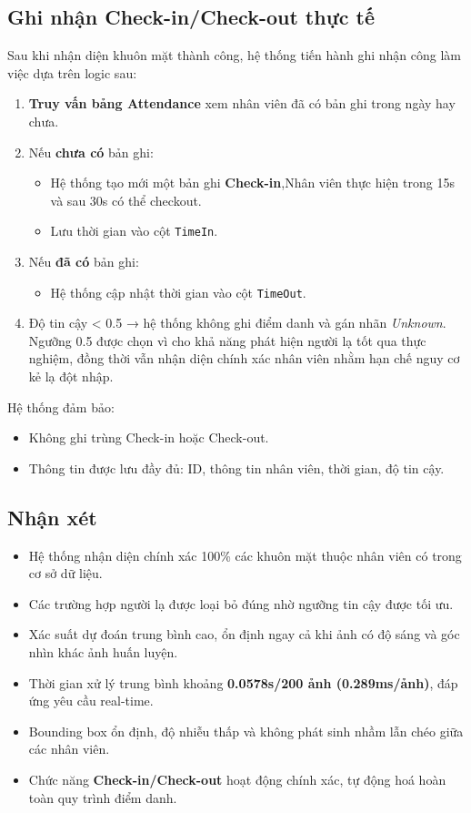 \documentclass[a4paper]{book}
\begin{document}
\subsection*{Ghi nhận Check-in/Check-out thực tế}

Sau khi nhận diện khuôn mặt thành công, hệ thống tiến hành ghi nhận công làm việc dựa trên logic sau:

\begin{enumerate}
    \item \textbf{Truy vấn bảng Attendance} xem nhân viên đã có bản ghi trong ngày hay chưa.
    \item Nếu \textbf{chưa có} bản ghi:
    \begin{itemize}
        \item Hệ thống tạo mới một bản ghi \textbf{Check-in},Nhân viên thực hiện trong 15s và sau 30s có thể checkout.
        \item Lưu thời gian vào cột \texttt{TimeIn}.
    \end{itemize}
    \item Nếu \textbf{đã có} bản ghi:
    \begin{itemize}
        \item Hệ thống cập nhật thời gian vào cột \texttt{TimeOut}.
    \end{itemize}
    \item Độ tin cậy < 0.5 → hệ thống không ghi điểm danh và gán nhãn \textit{Unknown}. Ngưỡng 0.5 được chọn vì cho khả năng phát hiện người lạ tốt qua thực nghiệm, đồng thời vẫn nhận diện chính xác nhân viên nhằm hạn chế nguy cơ kẻ lạ đột nhập.

\end{enumerate}

Hệ thống đảm bảo:
\begin{itemize}
    \item Không ghi trùng Check-in hoặc Check-out.  
    \item Thông tin được lưu đầy đủ: ID, thông tin nhân viên, thời gian, độ tin cậy.  
\end{itemize}

\subsection*{Nhận xét}
\begin{itemize}
    \item Hệ thống nhận diện chính xác 100\% các khuôn mặt thuộc nhân viên có trong cơ sở dữ liệu.
    \item Các trường hợp người lạ được loại bỏ đúng nhờ ngưỡng tin cậy được tối ưu.
    \item Xác suất dự đoán trung bình cao, ổn định ngay cả khi ảnh có độ sáng và góc nhìn khác ảnh huấn luyện.
    \item Thời gian xử lý trung bình khoảng \textbf{0.0578s/200 ảnh (0.289ms/ảnh)}, đáp ứng yêu cầu real-time.
    \item Bounding box ổn định, độ nhiễu thấp và không phát sinh nhầm lẫn chéo giữa các nhân viên.
    \item Chức năng \textbf{Check-in/Check-out} hoạt động chính xác, tự động hoá hoàn toàn quy trình điểm danh.
\end{itemize}
\end{document}
